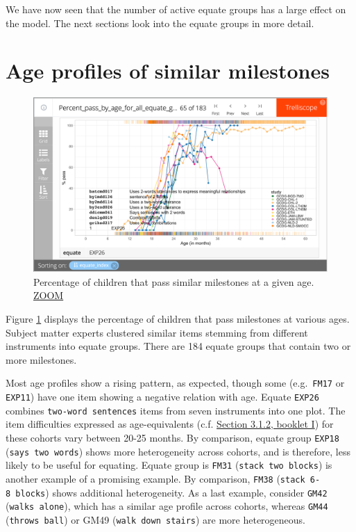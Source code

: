 \documentclass[
]{book}
\begin{document}
We have now seen that the number of active equate groups has a large effect on the model. The next sections look into the equate groups in more detail.

\hypertarget{sec:ageprofiles}{%
\section{Age profiles of similar milestones}\label{sec:ageprofiles}}

\begin{figure}

{\centering \includegraphics[width=1\linewidth]{fig/fig_5.3} 

}

\caption{Percentage of children that pass similar milestones at a given age. \href{https://d-score.org/dbook-apps/p-a-equate-1339/\#display=Percent_pass_by_age_for_all_equate_groups\&nrow=1\&ncol=1\&arr=row\&pg=65\&labels=equate\&sort=equate_index;asc\&filter=\&sidebar=\&fv=}{ZOOM}}\label{fig:p-a-equate-1339}
\end{figure}



Figure \ref{fig:p-a-equate-1339} displays the percentage of children that pass milestones at various ages. Subject matter experts clustered similar items stemming from different instruments into equate groups. There are 184 equate groups that contain two or more milestones.

Most age profiles show a rising pattern, as expected, though some (e.g.~\texttt{FM17} or \texttt{EXP11}) have one item showing a negative relation with age. Equate \texttt{EXP26} combines \texttt{two-word\ sentences} items from seven instruments into one plot. The item difficulties expressed as age-equivalents (c.f. \href{https://d-score.org/dbook1/sec-agebased.html\#sec:ageequivalent}{Section 3.1.2, booklet I}) for these cohorts vary between 20-25 months. By comparison, equate group \texttt{EXP18} (\texttt{says\ two\ words}) shows more heterogeneity across cohorts, and is therefore, less likely to be useful for equating. Equate group is \texttt{FM31} (\texttt{stack\ two\ blocks}) is another example of a promising example. By comparison, \texttt{FM38} (\texttt{stack\ 6-8\ blocks}) shows additional heterogeneity. As a last example, consider \texttt{GM42} (\texttt{walks\ alone}), which has a similar age profile across cohorts, whereas \texttt{GM44} (\texttt{throws\ ball}) or GM49 (\texttt{walk\ down\ stairs}) are more heterogeneous.
\end{document}
